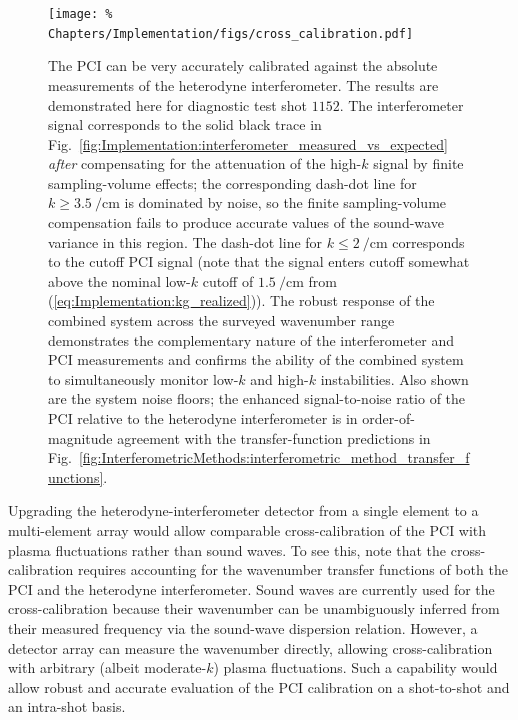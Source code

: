 \begin{figure}
  \centering
  \texttt{[image: \%
    Chapters/Implementation/figs/cross\_calibration.pdf]}
  \caption[Cross-calibration of PCI]{%
    The PCI can be very accurately calibrated
    against the absolute measurements of the heterodyne interferometer.
    The results are demonstrated here for diagnostic test shot $1152$.
    The interferometer signal corresponds to
    the solid black trace in
    Fig.~\ref{fig:Implementation:interferometer_measured_vs_expected}
    \emph{after} compensating for the attenuation of the high-$k$ signal
    by finite sampling-volume effects;
    the corresponding dash-dot line for $k \geq \SI{3.5}{\per\centi\meter}$
    is dominated by noise, so the finite sampling-volume compensation
    fails to produce accurate values of the sound-wave variance
    in this region.
    The dash-dot line for $k \leq \SI{2}{\per\centi\meter}$
    corresponds to the cutoff PCI signal
    (note that the signal enters cutoff somewhat above
    the nominal low-$k$ cutoff of $\SI{1.5}{\per\centi\meter}$
    from (\ref{eq:Implementation:kg_realized})).
    The robust response of the combined system
    across the surveyed wavenumber range
    demonstrates the complementary nature
    of the interferometer and PCI measurements and
    confirms the ability of the combined system
    to simultaneously monitor low-$k$ and high-$k$ instabilities.
    Also shown are the system noise floors;
    the enhanced signal-to-noise ratio of the PCI
    relative to the heterodyne interferometer
    is in order-of-magnitude agreement with
    the transfer-function predictions in
    Fig.~\ref{fig:InterferometricMethods:interferometric_method_transfer_functions}.
  }
\label{fig:Implementation:cross_calibration}
\end{figure}

Upgrading the heterodyne-interferometer detector
from a single element to a multi-element array
would allow comparable cross-calibration of the PCI
with plasma fluctuations rather than sound waves.
To see this, note that the cross-calibration requires
accounting for the wavenumber transfer functions
of both the PCI and the heterodyne interferometer.
Sound waves are currently used for the cross-calibration
because their wavenumber can be unambiguously inferred
from their measured frequency via the sound-wave dispersion relation.
However, a detector array can measure the wavenumber directly,
allowing cross-calibration with arbitrary
(albeit moderate-$k$) plasma fluctuations.
Such a capability would allow robust and accurate evaluation
of the PCI calibration on a shot-to-shot and an intra-shot basis.


